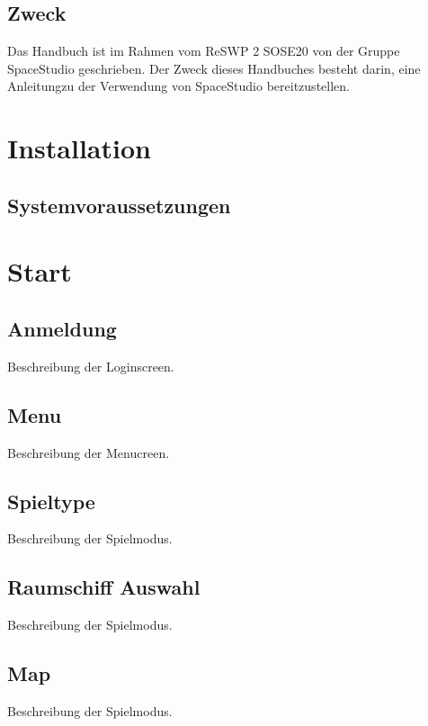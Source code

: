 \documentclass[fontsize=12pt,paper=a4,twoside]{scrartcl}
\begin{document}
\subsection{Zweck}

Das Handbuch ist im Rahmen vom ReSWP 2 SOSE20 von der Gruppe SpaceStudio geschrieben. Der Zweck dieses Handbuches besteht darin, eine Anleitungzu der Verwendung von SpaceStudio bereitzustellen.


\section{Installation}


\subsection{Systemvoraussetzungen}

\section{Start}

\subsection{Anmeldung}
Beschreibung der Loginscreen.

\subsection{Menu}
Beschreibung der Menucreen.

\subsection{Spieltype}
Beschreibung der Spielmodus.

\subsection{Raumschiff Auswahl}
Beschreibung der Spielmodus.

\subsection{Map}
Beschreibung der Spielmodus.
\end{document}
